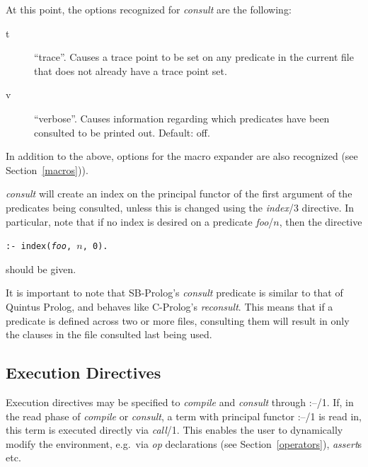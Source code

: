 At this point, the options recognized for {\em consult} are the following:
\begin{description}
\item[t] ``trace''.
    Causes a trace point to be set on any predicate in the current
    file that does not already have a trace point set.
\item[v] ``verbose''.
    Causes information regarding which predicates have been
    consulted to be printed out. Default: off.
\end{description}

In addition to the above, options for the macro expander
are also recognized (see Section~\ref{macros})).

{\em consult} will create an index on the principal functor of the
first argument of the predicates being consulted,
unless this is changed using the {\em index}/3 directive.
In particular, note that if no index is desired on a predicate {\em foo}/$n$,
then the directive
\begin{center}
{\tt :- index(\/{\em foo}, $n$, 0).}
\end{center}
should be given.

It is important to note that SB-Prolog's {\em consult}
predicate is similar to that of Quintus Prolog,
and behaves like C-Prolog's {\em reconsult}.
This means that if a predicate is defined across two or more files,
consulting them will result in only the clauses in the file consulted last
being used.
\subsection{Execution Directives}

Execution directives may be specified to {\em compile} and {\em consult}
through :--/1.
If, in the read phase of {\em compile} or {\em consult},
a term with principal functor :--/1 is read in,
this term is executed directly via {\em call}/1.
This enables the user to dynamically modify the environment, e.g.\ via
{\em op} declarations (see Section~\ref{operators}), {\em assert}s etc.

